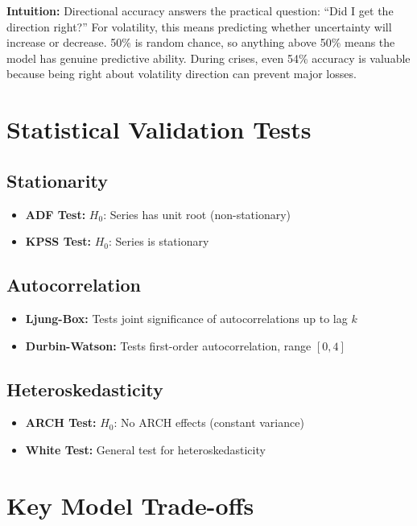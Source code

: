 \documentclass{article}
\begin{document}
\textbf{Intuition:} Directional accuracy answers the practical question: ``Did I get the direction right?'' For volatility, this means predicting whether uncertainty will increase or decrease. 50\% is random chance, so anything above 50\% means the model has genuine predictive ability. During crises, even 54\% accuracy is valuable because being right about volatility direction can prevent major losses.

\section{Statistical Validation Tests}

\subsection{Stationarity}
\begin{itemize}
\item \textbf{ADF Test:} $H_0$: Series has unit root (non-stationary)
\item \textbf{KPSS Test:} $H_0$: Series is stationary
\end{itemize}

\subsection{Autocorrelation}
\begin{itemize}
\item \textbf{Ljung-Box:} Tests joint significance of autocorrelations up to lag $k$
\item \textbf{Durbin-Watson:} Tests first-order autocorrelation, range $[0, 4]$
\end{itemize}

\subsection{Heteroskedasticity}
\begin{itemize}
\item \textbf{ARCH Test:} $H_0$: No ARCH effects (constant variance)
\item \textbf{White Test:} General test for heteroskedasticity
\end{itemize}

\section{Key Model Trade-offs}
\end{document}
